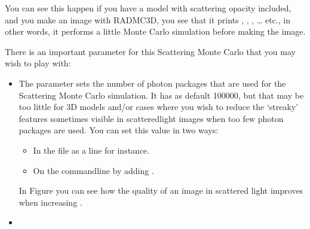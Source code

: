\documentclass[letterpaper,10pt,english]{sphinxmanual}
\begin{document}
You can see this happen if you have a model with scattering opacity included,
and you make an image with RADMC\sphinxhyphen{}3D, you see that it prints , ,
, … etc., in other words, it performs a little Monte Carlo simulation
before making the image.

There is an important parameter for this Scattering Monte Carlo that you
may wish to play with:
\begin{itemize}
\item {} 

The parameter  sets the number of photon packages
that are used for the Scattering Monte Carlo simulation. It has as default
100000, but that may be too little for 3\sphinxhyphen{}D models and/or cases where you
wish to reduce the ‘streaky’ features sometimes visible in
scattered\sphinxhyphen{}light images when too few photon packages are used. You can
set this value in two ways:
\begin{itemize}
\item {} 
In the  file as a line  for instance.

\item {} 
On the command\sphinxhyphen{}line by adding .

\end{itemize}

In Figure {\hyperref[\detokenize{dustradtrans:fig-polscat}]{}} you can see how the quality of an image in
scattered light improves when increasing .

\item {} 


\end{itemize}
\end{document}
